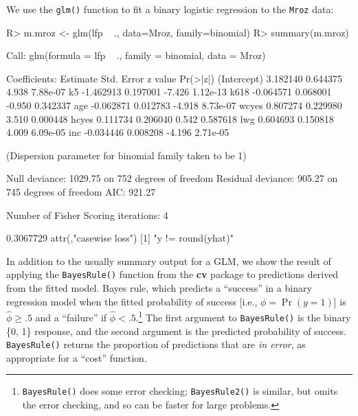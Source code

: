 \documentclass[
]{jss}
\begin{document}
We use the \texttt{glm()} function to fit a binary logistic regression
to the \texttt{Mroz} data:

\begin{CodeChunk}
\begin{CodeInput}
R> m.mroz <- glm(lfp ~ ., data=Mroz, family=binomial)
R> summary(m.mroz)
\end{CodeInput}
\begin{CodeOutput}

Call:
glm(formula = lfp ~ ., family = binomial, data = Mroz)

Coefficients:
             Estimate Std. Error z value Pr(>|z|)
(Intercept)  3.182140   0.644375   4.938 7.88e-07
k5          -1.462913   0.197001  -7.426 1.12e-13
k618        -0.064571   0.068001  -0.950 0.342337
age         -0.062871   0.012783  -4.918 8.73e-07
wcyes        0.807274   0.229980   3.510 0.000448
hcyes        0.111734   0.206040   0.542 0.587618
lwg          0.604693   0.150818   4.009 6.09e-05
inc         -0.034446   0.008208  -4.196 2.71e-05

(Dispersion parameter for binomial family taken to be 1)

    Null deviance: 1029.75  on 752  degrees of freedom
Residual deviance:  905.27  on 745  degrees of freedom
AIC: 921.27

Number of Fisher Scoring iterations: 4
\end{CodeOutput}
\begin{CodeOutput}
[1] 0.3067729
attr(,"casewise loss")
[1] "y != round(yhat)"
\end{CodeOutput}
\end{CodeChunk}

In addition to the usually summary output for a GLM, we show the result
of applying the \texttt{BayesRule()} function from the \textbf{cv}
package to predictions derived from the fitted model. Bayes rule, which
predicts a ``success'' in a binary regression model when the fitted
probability of success {[}i.e., \(\phi = \Pr(y = 1)\){]} is
\(\widehat{\phi} \ge .5\) and a ``failure'' if
\(\widehat{\phi} < .5\).\footnote{\texttt{BayesRule()} does some error
  checking; \texttt{BayesRule2()} is similar, but omits the error
  checking, and so can be faster for large problems.} The first argument
to \texttt{BayesRule()} is the binary \{0, 1\} response, and the second
argument is the predicted probability of success. \texttt{BayesRule()}
returns the proportion of predictions that are \emph{in error}, as
appropriate for a ``cost'' function.
\end{document}
